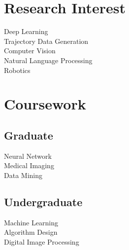 \documentclass[]{deedy-resume-openfont}
\begin{document}
\begin{minipage}[t]{0.33\textwidth}
\section{Research Interest}
Deep Learning \\
Trajectory Data Generation \\
Computer Vision \\
Natural Language Processing \\
Robotics
\sectionsep


\section{Coursework}
\subsection{Graduate}
Neural Network \\
Medical Imaging \\
Data Mining \\
\sectionsep

\subsection{Undergraduate}
Machine Learning \\
Algorithm Design \\
Digital Image Processing \\
\sectionsep



\end{minipage}
\end{document}
